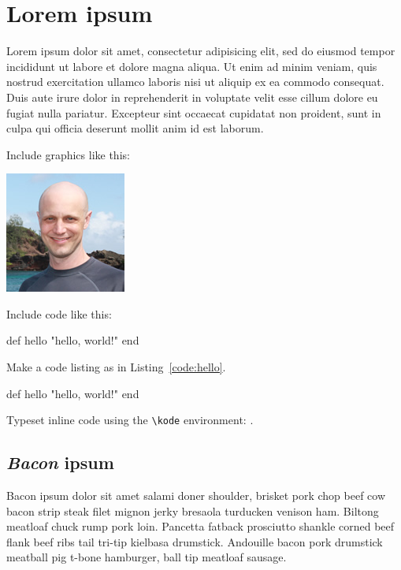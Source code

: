 \chapter{Lorem ipsum}
\label{cha:lorem_ipsum}

Lorem ipsum dolor sit amet, consectetur adipisicing elit, sed do eiusmod
tempor incididunt ut labore et dolore magna aliqua. Ut enim ad minim veniam,
quis nostrud exercitation ullamco laboris nisi ut aliquip ex ea commodo
consequat. Duis aute irure dolor in reprehenderit in voluptate velit esse
cillum dolore eu fugiat nulla pariatur. Excepteur sint occaecat cupidatat non
proident, sunt in culpa qui officia deserunt mollit anim id est laborum.

Include graphics like this:

\includegraphics{images/michael_hartl.png}

Include code like this:

\begin{code}
def hello
  "hello, world!"
end
\end{code}

Make a code listing as in Listing~\ref{code:hello}.

\begin{codelisting}
\label{code:hello}
\begin{code}
def hello
  "hello, world!"
end
\end{code}
\end{codelisting}

Typeset inline code using the \verb+\kode+ environment: .

\section{\emph{Bacon} ipsum}
\label{sec:bacon_ipsum}

Bacon ipsum dolor sit amet salami doner shoulder, brisket pork chop beef cow bacon strip steak filet mignon jerky bresaola turducken venison ham. Biltong meatloaf chuck rump pork loin. Pancetta fatback prosciutto shankle corned beef flank beef ribs tail tri-tip kielbasa drumstick. Andouille bacon pork drumstick meatball pig t-bone hamburger, ball tip meatloaf sausage.

